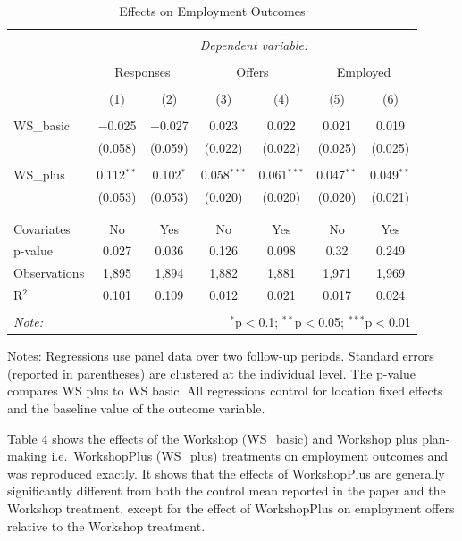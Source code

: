 \documentclass[]{elsarticle} %
\begin{document}
\begin{table}[H] \centering 
  \caption{Effects on Employment Outcomes} 
  \label{} 
\begin{tabular}{@{\extracolsep{5pt}}lcccccc} 
\\[-1.8ex]\hline 
\hline \\[-1.8ex] 
 & \multicolumn{6}{c}{\textit{Dependent variable:}} \\ 
\cline{2-7} 
\\[-1.8ex] & \multicolumn{2}{c}{Responses} & \multicolumn{2}{c}{Offers} & \multicolumn{2}{c}{Employed} \\ 
\\[-1.8ex] & (1) & (2) & (3) & (4) & (5) & (6)\\ 
\hline \\[-1.8ex] 
 WS\_basic & $-$0.025 & $-$0.027 & 0.023 & 0.022 & 0.021 & 0.019 \\ 
  & (0.058) & (0.059) & (0.022) & (0.022) & (0.025) & (0.025) \\ 
  & & & & & & \\ 
 WS\_plus & 0.112$^{**}$ & 0.102$^{*}$ & 0.058$^{***}$ & 0.061$^{***}$ & 0.047$^{**}$ & 0.049$^{**}$ \\ 
  & (0.053) & (0.053) & (0.020) & (0.020) & (0.020) & (0.021) \\ 
  & & & & & & \\ 
\hline \\[-1.8ex] 
Covariates & No & Yes & No & Yes & No & Yes \\ 
p-value & 0.027 & 0.036 & 0.126 & 0.098 & 0.32 & 0.249 \\ 
Observations & 1,895 & 1,894 & 1,882 & 1,881 & 1,971 & 1,969 \\ 
R$^{2}$ & 0.101 & 0.109 & 0.012 & 0.021 & 0.017 & 0.024 \\ 
\hline 
\hline \\[-1.8ex] 
\textit{Note:}  & \multicolumn{6}{r}{$^{*}$p$<$0.1; $^{**}$p$<$0.05; $^{***}$p$<$0.01} \\ 
\end{tabular} 
\end{table}

Notes: Regressions use panel data over two follow-up periods. Standard
errors (reported in parentheses) are clustered at the individual level.
The p-value compares WS plus to WS basic. All regressions control for
location fixed effects and the baseline value of the outcome variable.

Table 4 shows the effects of the Workshop (WS\_basic) and Workshop plus
plan-making i.e.~WorkshopPlus (WS\_plus) treatments on employment
outcomes and was reproduced exactly. It shows that the effects of
WorkshopPlus are generally significantly different from both the control
mean reported in the paper and the Workshop treatment, except for the
effect of WorkshopPlus on employment offers relative to the Workshop
treatment.
\end{document}
